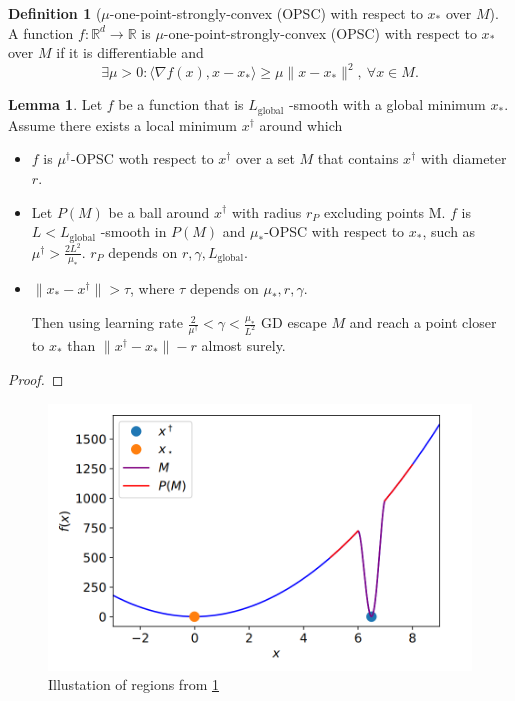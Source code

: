 \documentclass{article}
\theoremstyle{definition}
\newtheorem{definition}{Definition}[section]
\newtheorem{lemma}[theorem]{Lemma}
\begin{document}
\begin{definition}[$\mu$-one-point-strongly-convex (OPSC) with respect to $x_\ast$ over $M$]
    A function $f: \mathbb{R}^d \rightarrow \mathbb{R}$ is 
    $\mu$-one-point-strongly-convex (OPSC) with respect to $x_\ast$ over $M$ 
    if it is differentiable and 
    $$\exists \mu > 0: \langle \nabla f(x), x - x_\ast \rangle \geq \mu \| x - x_\ast\|^2, \: \forall x \in M.$$
\end{definition}

\begin{lemma}\label{lma1}
    Let $f$ be a function that is 
    $L_{\mathrm{global}}$ -smooth with a global minimum $x_\ast$. 
    Assume there exists a local minimum $x^\dagger$ around which
    \begin{itemize}
        \item $f$ is $\mu^\dagger$-OPSC woth respect to 
        $x^\dagger$ over a set $M$ that contains $x^\dagger$ with diameter $r$.
        
        \item Let $P(M)$ be a ball around $x^\dagger$ with radius 
        $r_P$ excluding points M. $f$ is 
        $L < L_{\mathrm{global}}$ -smooth in $P(M)$ and 
        $\mu_\ast$-OPSC with respect to $x_\ast$, 
        such as $\mu^\dagger > \frac{2L^2}{\mu_\ast}$. 
        $r_P$ depends on $r, \gamma, L_{\mathrm{global}}$.

        \item $\| x_\ast - x^\dagger \| > \tau$, where $\tau$ depends on $\mu_\ast, r, \gamma$. 

        Then using learning rate $\frac{2}{\mu^\dagger} < \gamma < \frac{\mu_\ast}{L^2}$
        GD escape $M$ and reach a point closer to $x_\ast$ than 
        $\| x^\dagger - x_\ast\| - r$ almost surely. 

    \end{itemize}
\end{lemma}
\begin{proof}
    
\end{proof}

\begin{figure}[h]
    \caption{Illustation of regions from \cref{lma1}}
    \label{fig:func}
    \centering
    \includegraphics[scale=0.2]{lemma1}
\end{figure}
\end{document}
